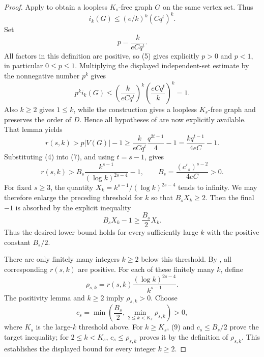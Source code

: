\begin{proof}
Apply  to obtain a loopless $K_s$-free
graph $G$ on the same vertex set.  Thus
\[
 i_k(G)\leq(e/k)^k(Cq^t)^k.
\]
Set
\[
                    p=\frac{k}{eCq^t}.
\]
All factors in this definition are positive, so (5) gives explicitly
$p>0$ and $p<1$, in particular $0\leq p\leq1$.  Multiplying the displayed
independent-set estimate by the nonnegative number $p^k$ gives
\[
 p^k i_k(G)
 \leq\left(\frac{k}{eCq^t}\right)^k
       \left(\frac{eCq^t}{k}\right)^k=1.                       \tag{6}
\]
Also $k\geq2$ gives $1\leq k$, while the construction gives a loopless
$K_s$-free graph and preserves the order of $D$.  Hence all hypotheses of
 are now explicitly available.  That lemma yields
\[
 r(s,k)>p|V(G)|-1
 \geq\frac{k}{eCq^t}\frac{q^{2t-1}}4-1
 =\frac{kq^{t-1}}{4eC}-1.                                    \tag{7}
\]
Substituting (4) into (7), and using $t=s-1$, gives
\[
 r(s,k)>B_s\frac{k^{s-1}}{(\log k)^{2s-4}}-1,\qquad
 B_s=\frac{(c'_s)^{s-2}}{4eC}>0.                              \tag{8}
\]
For fixed $s\geq3$, the quantity
$X_k=k^{s-1}/(\log k)^{2s-4}$ tends to infinity.  We may therefore enlarge
the preceding threshold for $k$ so that $B_sX_k\geq2$.  Then the final
$-1$ is absorbed by the explicit inequality
\[
 B_sX_k-1\geq\frac{B_s}{2}X_k.                                \tag{9}
\]
Thus the desired lower bound holds for every sufficiently large $k$ with
the positive constant $B_s/2$.

There are only finitely many integers $k\geq2$ below this threshold.  By
, all corresponding $r(s,k)$ are positive.
For each of these finitely many $k$, define
\[
 \rho_{s,k}=r(s,k)\frac{(\log k)^{2s-4}}{k^{s-1}}.
\]
The positivity lemma and $k\geq2$ imply $\rho_{s,k}>0$.  Choose
\[
 c_s=\min\left(\frac{B_s}{2},\min_{2\leq k<K_s}\rho_{s,k}\right)>0,\tag{10}
\]
where $K_s$ is the large-$k$ threshold above.  For $k\geq K_s$, (9) and
$c_s\leq B_s/2$ prove the target inequality; for $2\leq k<K_s$,
$c_s\leq\rho_{s,k}$ proves it by the definition of $\rho_{s,k}$.
This establishes the displayed bound for every integer $k\geq2$.
\end{proof}
